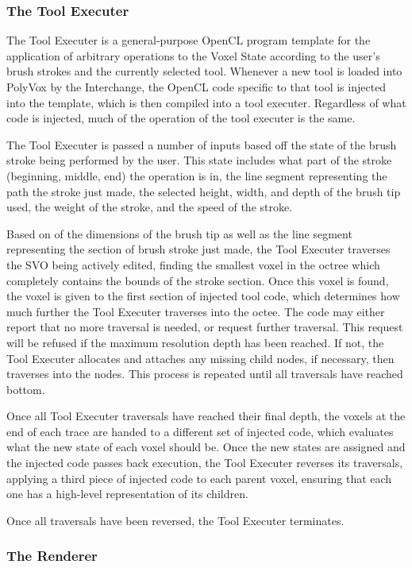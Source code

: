 \documentclass[onecolumn, draftclsnofoot,10pt, compsoc]{IEEEtran}
\begin{document}
\subsubsection{The Tool Executer}
The Tool Executer is a general-purpose OpenCL program template for the application of arbitrary operations to the Voxel State according to the user’s brush strokes and the currently selected tool. Whenever a new tool is loaded into PolyVox by the Interchange, the OpenCL code specific to that tool is injected into the template, which is then compiled into a tool executer. Regardless of what code is injected, much of the operation of the tool executer is the same.

The Tool Executer is passed a number of inputs based off the state of the brush stroke being performed by the user. This state includes what part of the stroke (beginning, middle, end) the operation is in, the line segment representing the path the stroke just made, the selected height, width, and depth of the brush tip used, the weight of the stroke, and the speed of the stroke.

Based on of the dimensions of the brush tip as well as the line segment representing the section of brush stroke just made, the Tool Executer traverses the SVO being actively edited, finding the smallest voxel in the octree which completely contains the bounds of the stroke section. Once this voxel is found, the voxel is given to the first section of injected tool code, which determines how much further the Tool Executer traverses into the octee. The code may either report that no more traversal is needed, or request further traversal. This request will be refused if the maximum resolution depth has been reached. If not, the Tool Executer allocates and attaches any missing child nodes, if necessary, then traverses into the nodes. This process is repeated until all traversals have reached bottom.

Once all Tool Executer traversals have reached their final depth, the voxels at the end of each trace are handed to a different set of injected code, which evaluates what the new state of each voxel should be. Once the new states are assigned and the injected code passes back execution, the Tool Executer reverses its traversals, applying a third piece of injected code to each parent voxel, ensuring that each one has a high-level representation of its children.

Once all traversals have been reversed, the Tool Executer terminates.
\subsubsection{The Renderer}
\end{document}

